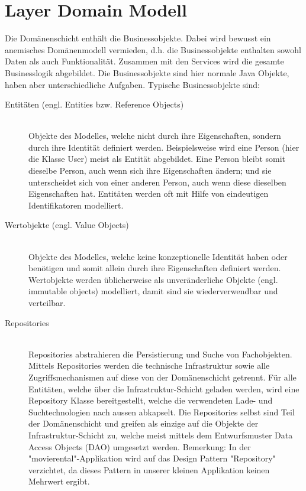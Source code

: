 \documentclass[a4paper,10pt]{scrreprt}
\begin{document}
\section{Layer Domain Modell}
Die Domänenschicht enthält die Businessobjekte. Dabei wird bewusst ein anemisches
Domänenmodell vermieden, d.h. die Businessobjekte enthalten sowohl Daten als auch
Funktionalität. Zusammen mit den Services wird die gesamte Businesslogik abgebildet.
Die Businessobjekte sind hier normale Java Objekte, haben aber unterschiedliche Aufgaben.
Typische Businessobjekte sind:
\begin{description}
 \item [Entitäten (engl. Entities bzw. Reference Objects)] \hfill \\
 Objekte des Modelles, welche nicht durch ihre Eigenschaften, sondern durch ihre Identität
definiert werden. Beispielsweise wird eine Person (hier die Klasse User) meist als Entität
abgebildet. Eine Person bleibt somit dieselbe Person, auch wenn sich ihre Eigenschaften
ändern; und sie unterscheidet sich von einer anderen Person, auch wenn diese dieselben
Eigenschaften hat. Entitäten werden oft mit Hilfe von eindeutigen Identifikatoren modelliert.
\item[Wertobjekte (engl. Value Objects)] \hfill \\
Objekte des Modelles, welche keine konzeptionelle Identität haben oder benötigen und somit
allein durch ihre Eigenschaften definiert werden. Wertobjekte werden üblicherweise als
unveränderliche Objekte (engl. immutable objects) modelliert, damit sind sie
wiederverwendbar und verteilbar.
\item[Repositories] \hfill \\
Repositories abstrahieren die Persistierung und Suche von Fachobjekten. Mittels 
Repositories werden die technische Infrastruktur sowie alle Zugriffsmechanismen auf diese von der
Domänenschicht getrennt. Für alle Entitäten, welche über die Infrastruktur-Schicht geladen
werden, wird eine Repository Klasse bereitgestellt, welche die verwendeten Lade- und
Suchtechnologien nach aussen abkapselt. Die Repositories selbst sind Teil der
Domänenschicht und greifen als einzige auf die Objekte der Infrastruktur-Schicht zu, welche
meist mittels dem Entwurfsmuster Data Access Objects (DAO) umgesetzt werden.
Bemerkung: In der "movierental"-Applikation wird auf das Design Pattern "Repository" verzichtet, da
dieses Pattern in unserer kleinen Applikation keinen Mehrwert ergibt.
\end{description}
\end{document}
